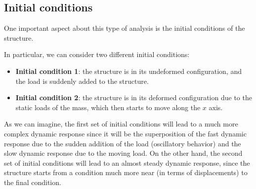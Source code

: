 \subsection{Initial conditions}
\label{subsec:initial_conditions}

One important aspect about this type of analysis is the initial conditions of the structure.

In particular, we can consider two different initial conditions:

\begin{itemize}
    \item \textbf{Initial condition 1}: the structure is in its undeformed configuration, and the load is suddenly added to the structure.
    \item \textbf{Initial condition 2}: the structure is in its deformed configuration due to the static loads of the mass, which then starts to move along the $x$ axis.
\end{itemize}

As we can imagine, the first set of initial conditions will lead to a much more complex dynamic response since it will be the superposition of the fast dynamic response due to the sudden addition of the load (oscillatory behavior) and the slow dynamic response due to the moving load.
On the other hand, the second set of initial conditions will lead to an almost steady dynamic response, since the structure starts from a condition much more near (in terms of displacements) to the final condition.